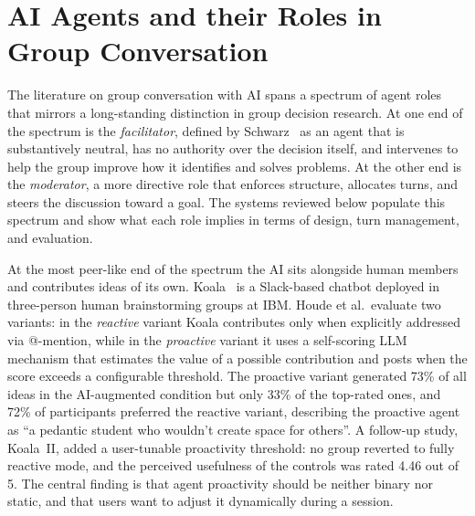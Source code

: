 \section{AI Agents and their Roles in Group Conversation}
\label{sec:ai-roles}

The literature on group conversation with AI spans a spectrum of agent roles that mirrors a long-standing distinction in group decision research. At one end of the spectrum is the \emph{facilitator}, defined by Schwarz~\cite{schwarz2017facilitator} as an agent that is substantively neutral, has no authority over the decision itself, and intervenes to help the group improve how it identifies and solves problems. At the other end is the \emph{moderator}, a more directive role that enforces structure, allocates turns, and steers the discussion toward a goal. The systems reviewed below populate this spectrum and show what each role implies in terms of design, turn management, and evaluation.

At the most peer-like end of the spectrum the AI sits alongside human members and contributes ideas of its own. Koala~\cite{houde2025koala} is a Slack-based chatbot deployed in three-person human brainstorming groups at IBM. Houde et al.\ evaluate two variants: in the \emph{reactive} variant Koala contributes only when explicitly addressed via @-mention, while in the \emph{proactive} variant it uses a self-scoring LLM mechanism that estimates the value of a possible contribution and posts when the score exceeds a configurable threshold. The proactive variant generated 73\% of all ideas in the AI-augmented condition but only 33\% of the top-rated ones, and 72\% of participants preferred the reactive variant, describing the proactive agent as ``a pedantic student who wouldn't create space for others''. A follow-up study, Koala~II, added a user-tunable proactivity threshold: no group reverted to fully reactive mode, and the perceived usefulness of the controls was rated 4.46 out of 5. The central finding is that agent proactivity should be neither binary nor static, and that users want to adjust it dynamically during a session.

